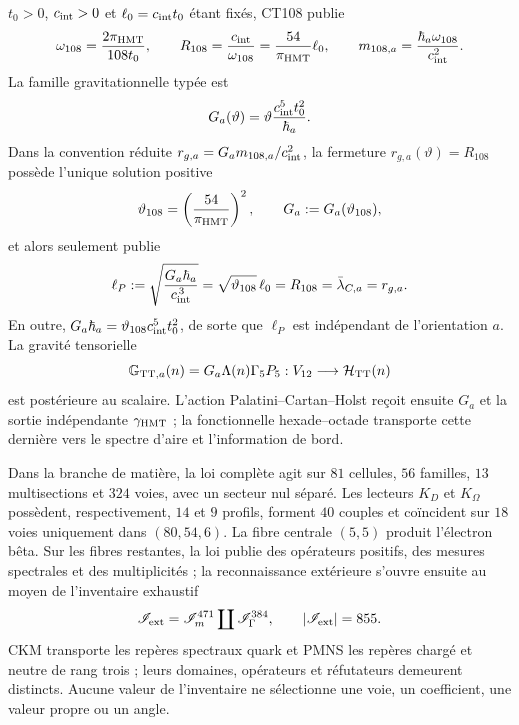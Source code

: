 \begin{theorem}
\(t_0>0\), \(c_{\rm int}>0\) et \(\ell_0=c_{\rm int}t_0\) étant fixés, CT108
publie
\begin{equation}
 \omega_{108}=\frac{2\pi_{\rm HMT}}{108t_0},\qquad
 R_{108}=\frac{c_{\rm int}}{\omega_{108}}
 =\frac{54}{\pi_{\rm HMT}}\ell_0,\qquad
 m_{108,a}=\frac{\hbar_a\omega_{108}}{c_{\rm int}^2}.
 \label{eq:frontal-reloj-gravedad}
\end{equation}
La famille gravitationnelle typée est
\begin{equation}
 G_a(\vartheta)=\vartheta\frac{c_{\rm int}^5t_0^2}{\hbar_a}.
 \label{eq:frontal-familia-gravedad}
\end{equation}
Dans la convention réduite
\(r_{g,a}=G_a m_{108,a}/c_{\rm int}^2\), la fermeture
\(r_{g,a}(\vartheta)=R_{108}\) possède l'unique solution positive
\begin{equation}
 \vartheta_{108}=\left(\frac{54}{\pi_{\rm HMT}}\right)^2,\qquad
 G_a:=G_a(\vartheta_{108}),
 \label{eq:frontal-selector-gravedad}
\end{equation}
et alors seulement publie
\begin{equation}
 \ell_P:=\sqrt{\frac{G_a\hbar_a}{c_{\rm int}^{\,3}}}
 =\sqrt{\vartheta_{108}}\,\ell_0
 =R_{108}=\bar\lambda_{C,a}=r_{g,a}.
 \label{eq:frontal-longitud-planck}
\end{equation}
En outre, \(G_a\hbar_a=\vartheta_{108}c_{\rm int}^5t_0^2\), de sorte que
\(\ell_P\) est indépendant de l'orientation \(a\). La gravité tensorielle
\[
 \mathbb G_{{\rm TT},a}(n)
 =G_a\Lambda(n)\Gamma_5P_5:
 V_{12}\longrightarrow\mathcal H_{\rm TT}(n)
\]
est postérieure au scalaire. L'action Palatini--Cartan--Holst reçoit ensuite
\(G_a\) et la sortie indépendante \(\gamma_{\rm HMT}\) ; la fonctionnelle
hexade--octade transporte cette dernière vers le spectre d'aire et l'information
de bord.

Dans la branche de matière, la loi complète agit sur \(81\) cellules, \(56\)
familles, \(13\) multisections et \(324\) voies, avec un secteur nul séparé. Les
lecteurs \(K_D\) et \(K_\Omega\) possèdent, respectivement, \(14\) et \(9\)
profils, forment \(40\) couples et coïncident sur \(18\) voies uniquement dans
\((80,54,6)\). La fibre centrale \((5,5)\) produit l'électron bêta. Sur les
fibres restantes, la loi publie des opérateurs positifs, des mesures spectrales et des
multiplicités ; la reconnaissance extérieure s'ouvre ensuite au moyen de
l'inventaire exhaustif
\begin{equation}
 \mathscr I_{\rm ext}
 =\mathscr I_m^{471}\coprod\mathscr I_\Gamma^{384},
 \qquad |\mathscr I_{\rm ext}|=855.
 \label{eq:frontal-inventario-masas-anchuras}
\end{equation}
CKM transporte les repères spectraux quark et PMNS les repères chargé et neutre
de rang trois ; leurs domaines, opérateurs et réfutateurs demeurent distincts.
Aucune valeur de l'inventaire ne sélectionne une voie, un coefficient, une valeur propre
ou un angle.
\end{theorem}

